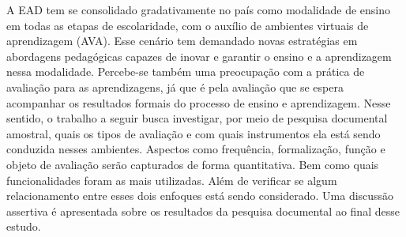 

A \acrfull{EAD} tem se consolidado gradativamente no país como modalidade de ensino em todas as etapas de escolaridade, com o auxílio de ambientes virtuais de aprendizagem (AVA). Esse cenário tem demandado novas estratégias em abordagens pedagógicas capazes de inovar e garantir o ensino e a aprendizagem nessa modalidade. Percebe-se também uma preocupação com a prática de avaliação para as aprendizagens, já que é pela avaliação que se espera acompanhar os resultados formais do processo de ensino e aprendizagem. Nesse sentido, o trabalho a seguir busca investigar, por meio de pesquisa documental amostral, quais os tipos de avaliação e com quais instrumentos ela está sendo conduzida nesses ambientes. Aspectos como frequência, formalização, função e objeto de avaliação serão capturados de forma quantitativa. Bem como quais funcionalidades foram as mais utilizadas. Além de verificar se algum relacionamento entre esses dois enfoques está sendo considerado. Uma discussão assertiva é apresentada sobre os resultados da pesquisa documental ao final desse estudo.


